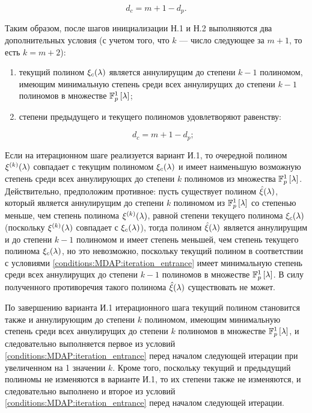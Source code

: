 	$$ d_c = m + 1 - d_p. $$

Таким образом, после шагов инициализации Н.1 и Н.2 выполняются два дополнительных условия (с учетом того, что $k$ --- число следующее
за $m+1$, то есть $k=m+2$):

\begin{conditions} \label{conditions:MDAP:iteration_entrance}
	\begin{enumerate}
		\item текущий полином $\xi_c (\lambda)$ является аннулирущим до степени $k-1$ полиномом, имеющим минимальную степень среди всех
			аннулирущих до степени $k-1$ полиномов в множестве $\mathbb{F}_p^1 \left [ \lambda \right ]$;

		\item степени предыдущего и текущего полиномов удовлетворяют равенству:

			$$ d_c = m + 1 - d_p ; $$
	\end{enumerate}
\end{conditions}

Если на итерационном шаге реализуется вариант И.1, то очередной полином $\xi^{(k)} (\lambda)$ совпадает с текущим полиномом $\xi_c (\lambda)$
и имеет наименьшую возможную степень среди всех аннулирующих до степени $k$ полиномов из множества $\mathbb{F}_p^1 \left [ \lambda \right ]$. Действительно, предположим
противное: пусть существует полином $\hat\xi (\lambda)$, который является аннулирущим до степени $k$ полиномом из $\mathbb{F}_p^1 \left [ \lambda \right ]$ со
степенью меньше, чем степень полинома $\xi^{(k)} (\lambda)$, равной степени текущего полинома $\xi_c (\lambda)$ (поскольку
$\xi^{(k)} (\lambda)$ совпадает с $\xi_c (\lambda)$), тогда полином $\hat\xi (\lambda)$ является аннулирущим и до степени $k-1$ полиномом
и имеет степень меньшей, чем степень текущего полинома $\xi_c (\lambda)$, но это невозможно, поскольку текущий полином в соответствии с
условиями \ref{conditions:MDAP:iteration_entrance} имеет минимальную степень среди всех аннулирущих до степени $k-1$ полиномов в множестве
$\mathbb{F}_p^1 \left [ \lambda \right ]$. В силу полученного противоречия такого полинома $\hat\xi (\lambda)$ существовать не может.

По завершению варианта И.1 итерационного шага текущий полином становится также и аннулирующим до степени $k$ полиномом, имеющим минимальную
степень среди всех аннулирущих до степени $k$ полиномов в множестве $\mathbb{F}_p^1 \left [ \lambda \right ]$, и следовательно выполняется первое из условий
\ref{conditions:MDAP:iteration_entrance} перед началом следующей итерации при увеличенном на 1 значении $k$. Кроме того, поскольку текущий
и предыдущий полиномы не изменяются в варианте И.1, то их степени также не изменяются, и следовательно выполнено и второе из условий
\ref{conditions:MDAP:iteration_entrance} перед началом следующей итерации.

